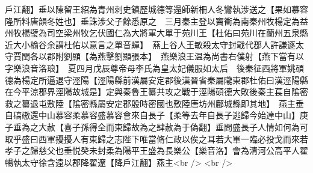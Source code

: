 戶江翻】垂以陳留王紹為青州刺史鎮歷城德等還師新柵人冬鸞執涉送之【果如慕容隆所料唐韻冬姓也】垂誅涉父子餘悉原之　三月秦主登以竇衝為南秦州牧楊定為益州牧楊璧為司空梁州牧乞伏國仁為大將軍大單于苑川王【杜佑曰苑川在蘭州五泉縣近大小榆谷余謂杜佑以意言之單音蟬】　燕上谷人王敏殺太守封戢代郡人許謙逐太守賈閏各以郡附劉顯【為燕擊劉顯張本】　燕樂浪王温為尚書右僕射【燕下當有以字樂浪音洛琅】　夏四月戊辰尊帝母李氏為皇太妃儀服如太后　後秦征西將軍姚碩德為楊定所逼退守涇陽【涇陽縣前漢屬安定郡後漢晉省秦屬隴東郡杜佑曰漢涇陽縣在今平涼郡界涇陽故城是】定與秦魯王纂共攻之戰于涇陽碩德大敗後秦主萇自隂密救之纂退屯敷陸【隂密縣屬安定郡殷時密國也敷陸唐坊州鄜城縣即其地】　燕主垂自碻磝還中山慕容柔慕容盛慕容會來自長子【柔等去年自長子逃歸今始達中山】庚子垂為之大赦【喜子孫得全而東歸故為之肆赦為于偽翻】垂問盛長子人情如何為可取乎盛曰西軍擾擾人有東歸之志陛下唯當脩仁政以俟之耳若大軍一臨必投戈而來若孝子之歸慈父也垂悦癸未封柔為陽平王盛為長樂公【樂音洛】會為清河公高平人翟暢執太守徐含遠以郡降翟遼【降戶江翻】燕主<br />
<br />
